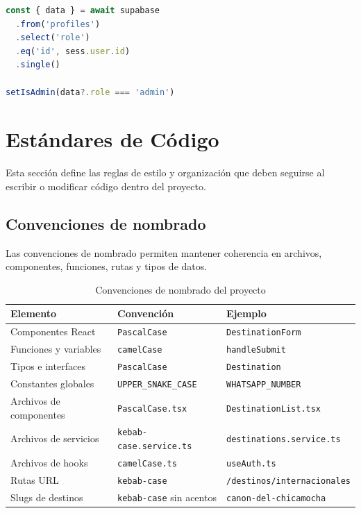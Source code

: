 \documentclass[12pt,letterpaper]{article}
\newcommand{\code}[1]{\nolinkurl{#1}}
\begin{document}
\begin{lstlisting}[language=typescript]
const { data } = await supabase
  .from('profiles')
  .select('role')
  .eq('id', sess.user.id)
  .single()

setIsAdmin(data?.role === 'admin')
\end{lstlisting}

\section{Estándares de Código}

Esta sección define las reglas de estilo y organización que deben seguirse al escribir o modificar código dentro del proyecto.

\subsection{Convenciones de nombrado}

Las convenciones de nombrado permiten mantener coherencia en archivos, componentes, funciones, rutas y tipos de datos.

\begin{longtable}{|p{}|p{}|p{}|}
\caption{Convenciones de nombrado del proyecto}\\
\hline
\textbf{Elemento} & \textbf{Convención} & \textbf{Ejemplo} \\
\hline
Componentes React & \code{PascalCase} & \code{DestinationForm} \\
\hline
Funciones y variables & \code{camelCase} & \code{handleSubmit} \\
\hline
Tipos e interfaces & \code{PascalCase} & \code{Destination} \\
\hline
Constantes globales & \code{UPPER\_SNAKE\_CASE} & \code{WHATSAPP\_NUMBER} \\
\hline
Archivos de componentes & \code{PascalCase.tsx} & \code{DestinationList.tsx} \\
\hline
Archivos de servicios & \code{kebab-case.service.ts} & \code{destinations.service.ts} \\
\hline
Archivos de hooks & \code{camelCase.ts} & \code{useAuth.ts} \\
\hline
Rutas URL & \code{kebab-case} & \code{/destinos/internacionales} \\
\hline
Slugs de destinos & \code{kebab-case} sin acentos & \code{canon-del-chicamocha} \\
\hline
\end{longtable}
\end{document}
